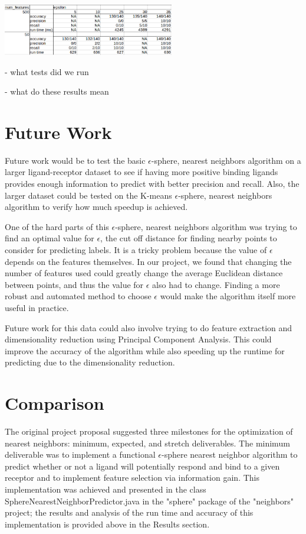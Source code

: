 \documentclass[11pt,letterpaper]{article}
\begin{document}
\includegraphics[width=75mm]{formattedData.png}

- what tests did we run

- what do these results mean

\section{Future Work}
Future work would be to test the basic $\epsilon$-sphere, nearest neighbors algorithm on a larger ligand-receptor dataset to see if having more positive binding ligands provides enough information to predict with better precision and recall.  Also, the larger dataset could be tested on the K-means $\epsilon$-sphere, nearest neighbors algorithm to verify how much speedup is achieved.

One of the hard parts of this $\epsilon$-sphere, nearest neighbors algorithm was trying to find an optimal value for $\epsilon$, the cut off distance for finding nearby points to consider for predicting labels.  It is a tricky problem because the value of $\epsilon$ depends on the features themselves.  In our project, we found that changing the number of features used could greatly change the average Euclidean distance between points, and thus the value for $\epsilon$ also had to change.  Finding a more robust and automated method to choose $\epsilon$ would make the algorithm itself more useful in practice.

Future work for this data could also involve trying to do feature extraction and dimensionality reduction using Principal Component Analysis.  This could improve the accuracy of the algorithm while also speeding up the runtime for predicting due to the dimensionality reduction.  

\section{Comparison}

The original project proposal suggested three milestones for the optimization of nearest neighbors: minimum, expected, and stretch deliverables. The minimum deliverable was to implement a functional $\epsilon$-sphere nearest neighbor algorithm to predict whether or not a ligand will potentially respond and bind to a given receptor and to implement feature selection via information gain. This implementation was achieved and presented in the class SphereNearestNeighborPredictor.java in the "sphere" package of the "neighbors" project; the results and analysis of the run time and accuracy of this implementation is provided above in the Results section.
\end{document}
